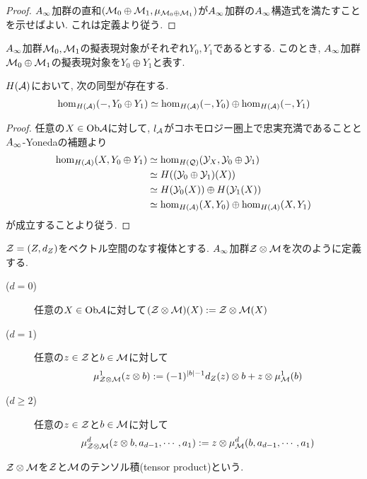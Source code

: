 \documentclass[uplatex, a4paper, 14Q, dvipdfmx]{jsarticle}
\begin{document}
\begin{proof}
  $A_{\infty}$加群の直和$(\mathcal{M}_0 \oplus \mathcal{M}_1, \mu_{\mathcal{M}_0 \oplus \mathcal{M}_1})$が$A_{\infty}$加群の$A_{\infty}$構造式を満たすことを示せばよい. 
  これは定義より従う.  
\end{proof}

\begin{notation}
  $A_{\infty}$加群$\mathcal{M}_0,\mathcal{M}_1$の擬表現対象がそれぞれ$Y_0,Y_1$であるとする.
  このとき, $A_{\infty}$加群$\mathcal{M}_0 \oplus \mathcal{M}_1$の擬表現対象を$Y_0 \oplus Y_1$と表す. 
\end{notation}

\begin{lemma}
  $H(\mathcal{A})$において, 次の同型が存在する.  
  \begin{align*}
    \hom_{H(\mathcal{A})}(-, Y_0 \oplus Y_1) \simeq \hom_{H(\mathcal{A})}(-,Y_0) \oplus \hom_{H(\mathcal{A})}(-,Y_1)
  \end{align*}
\end{lemma}

\begin{proof}
  任意の$X \in \mathrm{Ob}\mathcal{A}$に対して, $l_{\mathcal{A}}$がコホモロジー圏上で忠実充満であることと$A_{\infty}$-Yonedaの補題より
  \begin{align*}
    \hom_{H(\mathcal{A})}(X, Y_0 \oplus Y_1)
    &\simeq \hom_{H(\mathcal{Q})}(\mathcal{Y}_X, \mathcal{Y}_0 \oplus \mathcal{Y}_1) \\
    &\simeq H((\mathcal{Y}_0 \oplus \mathcal{Y}_1)(X)) \\
    &\simeq H(\mathcal{Y}_0(X)) \oplus H(\mathcal{Y}_1(X)) \\
    &\simeq \hom_{H(\mathcal{A})}(X,Y_0) \oplus \hom_{H(\mathcal{A})}(X,Y_1)
  \end{align*}
  が成立することより従う. 
\end{proof}

\begin{definition}[テンソル積]
  $\mathcal{Z} = (Z,d_Z)$をベクトル空間のなす複体とする. 
  $A_{\infty}$加群$\mathcal{Z} \otimes \mathcal{M}$を次のように定義する. 
  \begin{description}
    \item[($d=0$)] 任意の$X \in \mathrm{Ob}\mathcal{A}$に対して$(\mathcal{Z} \otimes \mathcal{M})(X) := \mathcal{Z} \otimes \mathcal{M}(X)$
    \item[($d = 1$)] 任意の$z \in \mathcal{Z}$と$b \in \mathcal{M}$に対して
    \begin{align*}
      \mu^1_{\mathcal{Z} \otimes \mathcal{M}}(z \otimes b) 
      := (-1)^{|b|-1} d_Z(z) \otimes b + z \otimes \mu^1_{\mathcal{M}}(b)
    \end{align*}
    \item[($d \geq 2$)] 任意の$z \in \mathcal{Z}$と$b \in \mathcal{M}$に対して
    \begin{align*}
      \mu^d_{\mathcal{Z} \otimes \mathcal{M}}(z \otimes b,a_{d-1},\cdots,a_1)
      := z \otimes \mu^d_{\mathcal{M}}(b,a_{d-1},\cdots,a_1)
    \end{align*}
  \end{description}
  $\mathcal{Z} \otimes \mathcal{M}$を$\mathcal{Z}$と$\mathcal{M}$のテンソル積(tensor product)という. 
\end{definition}
\end{document}
